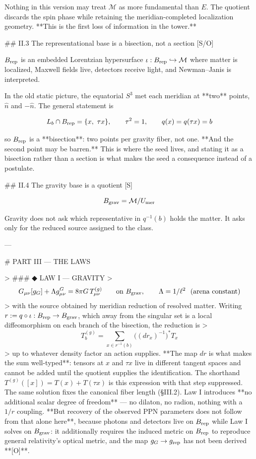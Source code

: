 Nothing in this version may treat $\mathcal{M}$ as more fundamental than $E$. The quotient discards the spin phase while retaining the meridian-completed localization geometry. **This is the first loss of information in the tower.**

## II.3 The representational base is a bisection, not a section [S/O]

$B_{\rm rep}$ is an embedded Lorentzian hypersurface $\iota:B_{\rm rep}\hookrightarrow\mathcal{M}$ where matter is localized, Maxwell fields live, detectors receive light, and Newman–Janis is interpreted.

In the old static picture, the equatorial $S^3$ met each meridian at **two** points, $\hat n$ and $-\hat n$. The general statement is

$$L_b\cap B_{\rm rep} = \{x,\ \tau x\},\qquad \tau^2 = 1,\qquad q(x) = q(\tau x) = b$$

so $B_{\rm rep}$ is a **bisection**: two points per gravity fiber, not one. **And the second point may be barren.** This is where the seed lives, and stating it as a bisection rather than a section is what makes the seed a consequence instead of a postulate.

## II.4 The gravity base is a quotient [S]

$$B_{\rm grav} = \mathcal{M}/U_{\rm mer}$$

Gravity does not ask which representative in $q^{-1}(b)$ holds the matter. It asks only for the reduced source assigned to the class.

---

# PART III — THE LAWS

> ### ◆ LAW I — GRAVITY
> $$G_{\mu\nu}[g_G] + \Lambda g^G_{\mu\nu} = 8\pi G\,T^{(g)}_{\mu\nu}\qquad\text{on } B_{\rm grav},\qquad \Lambda = 1/\ell^2\ \ \text{(arena constant)}$$
> with the source obtained by meridian reduction of resolved matter. Writing $r := q\circ\iota : B_{\rm rep}\to B_{\rm grav}$, which away from the singular set is a local diffeomorphism on each branch of the bisection, the reduction is
> $$T^{(g)}_b = \sum_{x\in r^{-1}(b)}\big((dr_x)^{-1}\big)^*T_x$$
> up to whatever density factor an action supplies. **The map $dr$ is what makes the sum well-typed**: tensors at $x$ and $\tau x$ live in different tangent spaces and cannot be added until the quotient supplies the identification. The shorthand $T^{(g)}([x]) = T(x)+T(\tau x)$ is this expression with that step suppressed. The same solution fixes the canonical fiber length (§III.2). Law I introduces **no additional scalar degree of freedom** — no dilaton, no radion, nothing with a $1/r$ coupling. **But recovery of the observed PPN parameters does not follow from that alone here**, because photons and detectors live on $B_{\rm rep}$ while Law I solves on $B_{\rm grav}$: it additionally requires the induced metric on $B_{\rm rep}$ to reproduce general relativity's optical metric, and the map $g_G\to g_{\rm rep}$ has not been derived **[O]**.


